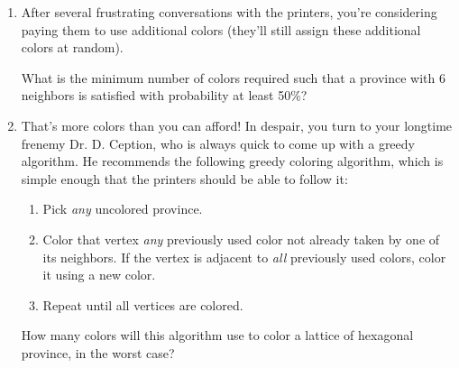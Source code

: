 \documentclass[12 pt, letterpaper]{hmcpset}
\begin{document}
\begin{problem}
\begin{enumerate}
    We say that a province is \emph{satisfied} if \emph{all} adjacent borders are satisfied. What is the chance that a random assignment of 4 colors satisfies a province with 6 neighbors? 
    
        \item After several frustrating conversations with the printers, you're considering paying them to use additional colors (they'll still assign these additional colors at random).

    What is the minimum number of colors required such that a province with 6 neighbors is satisfied with probability at least 50\%?

    \item That's more colors than you can afford! In despair, you turn to your longtime frenemy Dr. D. Ception, who is always quick to come up with a greedy algorithm. He recommends the following greedy coloring algorithm, which is simple enough that the printers should be able to follow it:
    \begin{enumerate}[label = (\arabic*)]
        \item Pick \emph{any} uncolored province.
        \item Color that vertex \emph{any} previously used color not already taken by one of its neighbors. If the vertex is adjacent to \emph{all} previously used colors, color it using a new color.
        \item Repeat until all vertices are colored.
    \end{enumerate}
    How many colors will this algorithm use to color a lattice of hexagonal province, in the worst case?
\end{enumerate}
\end{problem}
\end{document}
